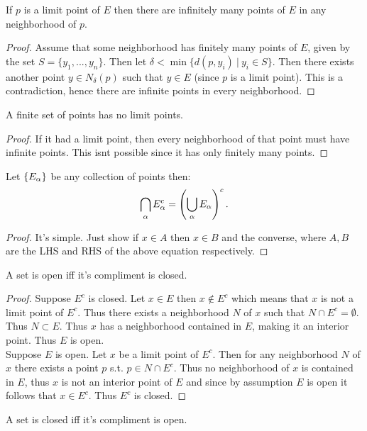 \begin{proposition}
  If $p$ is a limit point of $E$ then there are infinitely many points of $E$ in any neighborhood of $p$.
\end{proposition}
\begin{proof}
  Assume that some neighborhood has finitely many points of $E$, given by the set $S= \{y_1,...,y_n\}$. Then let $\delta < \min\{d(p,y_i)\ |\ y_i \in S\}$. Then there exists another point $y\in N_\delta (p)$ such that $y\in E$ (since $p$ is a limit point). This is a contradiction, hence there are infinite points in every neighborhood.
\end{proof}
\begin{corollary}
  A finite set of points has no limit points.
\end{corollary}
\begin{proof}
  If it had a limit point, then every neighborhood of that point must have infinite points. This isnt possible since it has only finitely many points.
\end{proof}
\begin{proposition}
  Let $\{E_\alpha\}$ be any collection of points then:
  \[\bigcap_\alpha E_\alpha^c = \left(\bigcup_\alpha E_\alpha\right)^c.\]
\end{proposition}
\begin{proof}
  It's simple. Just show if $x\in A$ then $x\in B$ and the converse, where $A,B$ are the LHS and RHS of the above equation respectively. 
\end{proof}
\begin{proposition}
  A set is open iff it's compliment is closed.
\end{proposition}
\begin{proof}
  Suppose $E^c$ is closed. Let $x\in E$ then $x\notin E^c$ which means that $x$ is not a limit point of $E^c$. Thus there exists a neighborhood $N$ of $x$ such that $N\cap E^c = \emptyset$. Thus $N\subset E$. Thus $x$ has a neighborhood contained in $E$, making it an interior point. Thus $E$ is open.\\

  Suppose $E$ is open. Let $x$ be a limit point of $E^c$. Then for any neighborhood $N$ of $x$ there exists a point $p$ s.t. $p\in N\cap E^c$. Thus no neighborhood of $x$ is contained in $E$, thus $x$ is not an interior point of $E$ and since by assumption $E$ is open it follows that $x\in E^c$. Thus $E^c$ is closed.
\end{proof}
\begin{corollary}
  A set is closed iff it's compliment is open.
\end{corollary}
